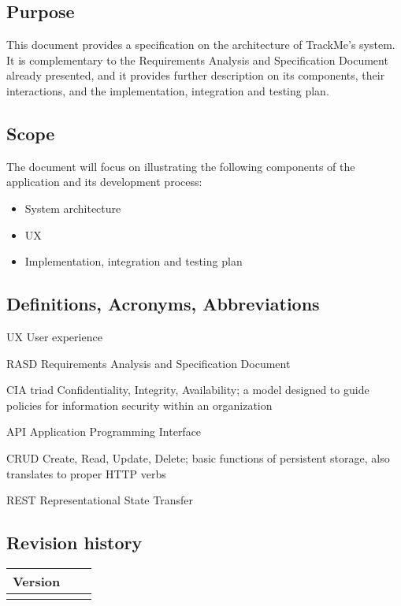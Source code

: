 \documentclass[../main.tex]{subfiles}
\begin{document}
\subsection{Purpose}

This document provides a specification on the architecture of TrackMe's system. It is complementary to the Requirements Analysis and Specification Document already presented, and it provides further description on its components, their interactions, and the implementation, integration and testing plan.

\subsection{Scope}

The document will focus on illustrating the following components of the application and its development process:

\begin{itemize}

	\item{System architecture}
	\item{UX}
	\item{Implementation, integration and testing plan}

\end{itemize}

\subsection{Definitions, Acronyms, Abbreviations}
\begin{description}
	\item {UX} User experience
	\item {RASD} Requirements Analysis and Specification Document
	\item {CIA triad} Confidentiality, Integrity, Availability; a model designed to guide policies for information security within an organization
	\item {API} Application Programming Interface
	\item {CRUD} Create, Read, Update, Delete; basic functions of persistent storage, also translates to proper HTTP verbs
	\item {REST} Representational State Transfer
\end{description}

\subsection{Revision history}
\begin{tabular}{p{1.2cm}|p{2.1cm}|p{2.6cm}}
	\bf Version & \bf \makebox[2.1cm][c]{Release Date} & \bf \makebox[3cm][c]{Description} \\
	\hline
	\makebox[1.2cm][c]{1.0} & \makebox[2.1cm][c]{10/12/2018} & \makebox[3cm][c]{Initial Release}\\
\end{tabular}
\end{document}

